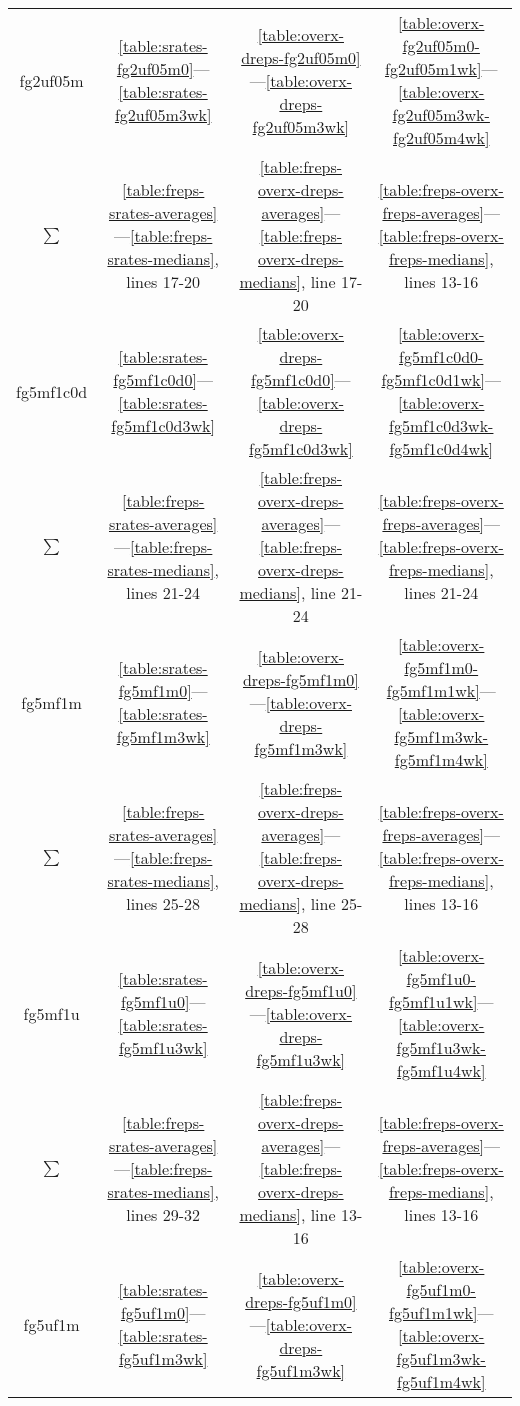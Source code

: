 \documentclass[10pt,oneside]{memoir}
\begin{document}
\begin{table}
\begin{tabular}{|cccc|}
\hline
fg2uf05m & \ref{table:srates-fg2uf05m0}—\ref{table:srates-fg2uf05m3wk} & \ref{table:overx-dreps-fg2uf05m0}—\ref{table:overx-dreps-fg2uf05m3wk} & \ref{table:overx-fg2uf05m0-fg2uf05m1wk}—\ref{table:overx-fg2uf05m3wk-fg2uf05m4wk} \\
$\sum$ & \ref{table:freps-srates-averages}—\ref{table:freps-srates-medians}, lines 17-20 & \ref{table:freps-overx-dreps-averages}—\ref{table:freps-overx-dreps-medians}, line 17-20 & \ref{table:freps-overx-freps-averages}—\ref{table:freps-overx-freps-medians}, lines 13-16  \\
\hline
fg5mf1c0d & \ref{table:srates-fg5mf1c0d0}—\ref{table:srates-fg5mf1c0d3wk} & \ref{table:overx-dreps-fg5mf1c0d0}—\ref{table:overx-dreps-fg5mf1c0d3wk} & \ref{table:overx-fg5mf1c0d0-fg5mf1c0d1wk}—\ref{table:overx-fg5mf1c0d3wk-fg5mf1c0d4wk} \\
$\sum$ & \ref{table:freps-srates-averages}—\ref{table:freps-srates-medians}, lines 21-24 & \ref{table:freps-overx-dreps-averages}—\ref{table:freps-overx-dreps-medians}, line 21-24 & \ref{table:freps-overx-freps-averages}—\ref{table:freps-overx-freps-medians}, lines 21-24  \\
\hline
fg5mf1m & \ref{table:srates-fg5mf1m0}—\ref{table:srates-fg5mf1m3wk} & \ref{table:overx-dreps-fg5mf1m0}—\ref{table:overx-dreps-fg5mf1m3wk} & \ref{table:overx-fg5mf1m0-fg5mf1m1wk}—\ref{table:overx-fg5mf1m3wk-fg5mf1m4wk} \\
$\sum$ & \ref{table:freps-srates-averages}—\ref{table:freps-srates-medians}, lines 25-28 & \ref{table:freps-overx-dreps-averages}—\ref{table:freps-overx-dreps-medians}, line 25-28 & \ref{table:freps-overx-freps-averages}—\ref{table:freps-overx-freps-medians}, lines 13-16  \\
\hline
fg5mf1u & \ref{table:srates-fg5mf1u0}—\ref{table:srates-fg5mf1u3wk} & \ref{table:overx-dreps-fg5mf1u0}—\ref{table:overx-dreps-fg5mf1u3wk} & \ref{table:overx-fg5mf1u0-fg5mf1u1wk}—\ref{table:overx-fg5mf1u3wk-fg5mf1u4wk} \\
$\sum$ & \ref{table:freps-srates-averages}—\ref{table:freps-srates-medians}, lines 29-32 & \ref{table:freps-overx-dreps-averages}—\ref{table:freps-overx-dreps-medians}, line 13-16 & \ref{table:freps-overx-freps-averages}—\ref{table:freps-overx-freps-medians}, lines 13-16  \\
\hline
fg5uf1m & \ref{table:srates-fg5uf1m0}—\ref{table:srates-fg5uf1m3wk} & \ref{table:overx-dreps-fg5uf1m0}—\ref{table:overx-dreps-fg5uf1m3wk} & \ref{table:overx-fg5uf1m0-fg5uf1m1wk}—\ref{table:overx-fg5uf1m3wk-fg5uf1m4wk} \\

\end{tabular}
\end{table}
\end{document}
